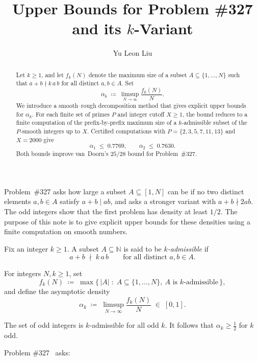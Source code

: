 \documentclass{amsart}
\title[Upper bounds for \Erdos\#327]{Upper Bounds for \Erdos Problem \#327 and its $k$-Variant}
\author{Yu Leon Liu}
\begin{document}
\begin{abstract}
Let $k \geq 1$, and let $f_k(N)$ denote the maximum size of a subset
$A \subseteq \{1, \dots, N\}$ such that $a + b \nmid k\,a\,b$ for all
distinct $a, b \in A$. Set
\[
\alpha_k \;\coloneqq\; \limsup_{N \to \infty} \frac{f_k(N)}{N}.
\]
We introduce a smooth--rough decomposition method that gives explicit
upper bounds for $\alpha_k$. For each finite set of primes $P$ and integer
cutoff $X \geq 1$, the bound reduces to a finite computation of the
prefix-by-prefix maximum size of a $k$-admissible subset of the $P$-smooth
integers up to $X$. Certified computations with
$P = \{2, 3, 5, 7, 11, 13\}$ and $X = 2000$ give
\[
\alpha_1 \;\leq\; 0.7769, \qquad \alpha_2 \;\leq\; 0.7630.
\]
Both bounds improve van~Doorn's $25/28$ bound for \Erdos{}
Problem~\#327.
\end{abstract}

\maketitle

\Erdos{} Problem~\#327 asks how large a subset $A \subseteq [1, N]$ can be if no two distinct elements $a, b \in A$ satisfy $a + b \mid ab$, and asks a stronger variant with $a + b \nmid 2ab$. The odd integers show that the first problem has density at least $1/2$. The purpose of this note is to give explicit upper bounds for these densities using a finite computation on smooth numbers.

\begin{definition}\label{def:admissible}
Fix an integer $k \geq 1$. A subset $A \subseteq \mathbb{N}$ is said to be
\emph{$k$-admissible} if
\[
a + b \;\nmid\; k\,a\,b \qquad \text{for all distinct } a, b \in A.
\]
\end{definition}

\begin{definition}\label{def:fk}
For integers $N, k \geq 1$, set
\[
f_k(N) \;\coloneqq\; \max\bigl\{\, |A| \;:\; A \subseteq \{1, \dots, N\},\ A \text{ is } k\text{-admissible}\,\bigr\},
\]
and define the asymptotic density
\[
\alpha_k \;\coloneqq\; \limsup_{N \to \infty} \frac{f_k(N)}{N} \;\in\; [0, 1].
\]
\end{definition}
\begin{observation}
The set of odd integers is $k$-admissible for all odd $k$. It follows that $\alpha_k \geq \frac{1}{2}$ for $k$ odd.
\end{observation}

\Erdos{} Problem \#327~\cite{bloom327} asks:
\end{document}
